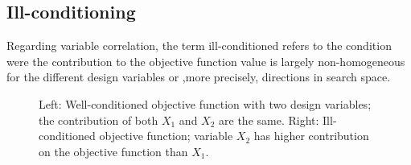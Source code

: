 \subsection{Ill-conditioning}
\label{IllCon}
Regarding variable correlation, the term ill-conditioned refers to the condition were the contribution to the objective function value is largely non-homogeneous for the different design variables or ,more precisely, directions in search space.

\begin{figure}[h!]
\begin{minipage}[b]{0.5\linewidth}
 \centering
\end{minipage}
\begin{minipage}[b]{0.5\linewidth}
 \centering
\end{minipage}
\caption{Left: Well-conditioned objective function with two design variables; the contribution of both $X_1$ and $X_2$ are the same. Right: Ill-conditioned objective function; variable $X_2$ has higher contribution on the objective function than $X_1$.} 
\label{illc}
\end{figure}

